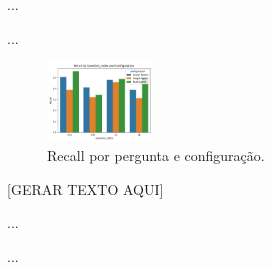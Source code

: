                 ...

                ...
                
                \begin{figure}[h!]
                    \centering              
                    \includegraphics[width=0.25\textwidth]{images_part_2/question_recall_question_index_configuration.png}
                    \caption{Recall por pergunta e configuração.}
                    \label{fig:question_recall_question_index_configuration}
                \end{figure}

                [GERAR TEXTO AQUI]

                ...

                ...
            